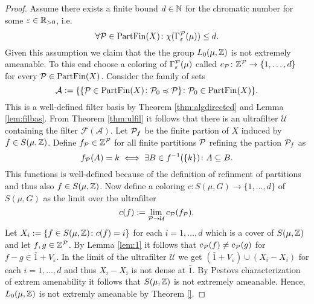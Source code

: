 \begin{proof}
  Assume there exists a finite bound $d \in \N$ for the chromatic number for some $\varepsilon \in \R_{>0}$, i.e.
  \begin{equation*}
    \forall \P \in {\rm PartFin}(X)\colon \chi(\Gamma_\varepsilon^{\P}(\mu)) \leq d. 
  \end{equation*}
  Given this assumption we claim that the the group $L_0(\mu, \Z)$ is not extremely ameanable. To this end choose a coloring of $\Gamma_{\varepsilon}^{\P}(\mu)$ called $c_{\P}\colon \Z^{\P} \to \{1, \ldots, d\}$ for every $\P \in {\rm PartFin}(X)$. Consider the family of sets
  \begin{equation*}
    \mathcal{A} := \{\{ \P \in {\rm PartFin}(X)\colon \P_0 \preccurlyeq \P\}\colon \P_0 \in {\rm PartFin}(X)\}.
  \end{equation*} 
  This is a well-defined filter basis by Theorem \ref{thm:algdirected} and Lemma \ref{lem:filbas}. From Theorem \ref{thm:ulfil} it follows that there is an ultrafilter $\mathcal{U}$ containing the filter $\mathcal{F}(\mathcal{A})$.
 Let $\P_f$ be the finite partion of $X$ induced by $f \in S(\mu, \Z)$. Define $f_\P \in \Z^\P$ for all finite partitions $\P$ refining the partion $\P_f$ as
  \begin{equation*}
    f_\P(A) = k \iff \exists B \in f^{-1}(\{k\})\colon A \subseteq B. 
  \end{equation*}
  This functions is well-defined because of the definition of refinment of partitions and thus also $f \in S(\mu, \Z)$.
  Now define a coloring $c: S(\mu, G) \to \{1, \ldots, d\}$ of $S(\mu, G)$ as the limit over the ultrafilter
  \begin{equation*}
    c(f) := \lim\limits_{\P \to \mathcal{U}} c_{\P}(f_\P).
  \end{equation*}
  Let $X_i := \{f \in S(\mu, \Z)\colon c(f) = i\}$ for each $i = 1, \ldots, d$ which is a cover of $S(\mu, \Z)$ and let $f, g \in \Z^\P$. By Lemma \ref{lem:1} it follows that $c_\P(f) \neq c_\P(g)$ for $f - g \in \bar{1} + V_\varepsilon$.
  In the limit of the ultrafilter $\mathcal{U}$ we get $(\bar{1} + V_\varepsilon) \cup (X_i - X_i)$ for each $i = 1, \ldots, d$ and thus $X_i - X_i$ is not dense at $\bar{1}$. By Pestovs characterization \cite[Theorem 3.4.9]{PestovDyn} of extrem amenability it follows that $S(\mu, \Z)$ is not extremely ameanable. Hence, $L_0(\mu, \Z)$ is not extremly ameanable by Theorem \ref{}. 


\end{proof}
